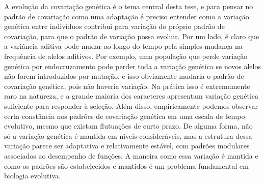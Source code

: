 \begin{refsection}
A evolução da covariação genética é o tema central desta tese, e para pensar
no padrão de covariação como uma adaptação é preciso entender como a variação
genética entre indivíduos contribui para variação do próprio padrão de
covariação, para que o padrão de variação possa evoluir. Por um lado, é claro
que a variância aditiva pode mudar ao longo do tempo pela simples mudança na
frequência de alelos aditivos. Por exemplo, uma população que perde variação
genética por endocruzamento pode  perder toda a variação genética se novos
alelos não forem introduzidos por mutação, e isso obviamente mudaria o padrão
de covariação genética, pois não haveria variação. Na prática isso é
extremamente raro na natureza, e a grande maioria dos caracteres apresentam
variação genética suficiente para responder à seleção. Além disso,
empiricamente podemos observar certa constância nos padrões de covariação
genética em uma escala de tempo evolutivo, mesmo que existam flutuações de
curto prazo. De alguma forma, não só a variação genética é mantida em níveis
consideráveis, mas a estrutura dessa variação parece ser adaptativa e
relativamente estável, com padrões modulares associados ao desempenho de
funções. A maneira como essa variação é mantida e como os padrões são
estabelecidos e mantidos é um problema fundamental em biologia evolutiva.


\end{refsection}
